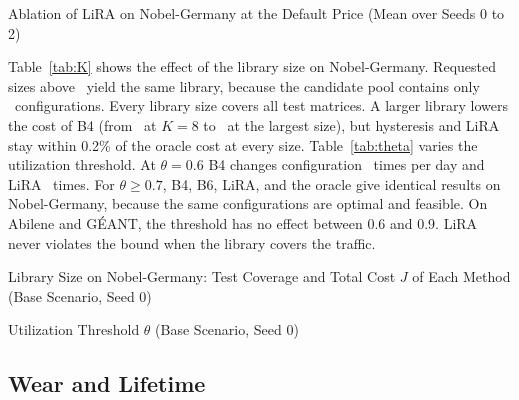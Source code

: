 \documentclass[preprint,12pt]{elsarticle}
\begin{document}
\begin{table}[t]
\centering
\caption{Ablation of LiRA on Nobel-Germany at the Default Price (Mean over Seeds 0 to 2)}
\label{tab:ablation}
\scriptsize
\setlength{\tabcolsep}{2pt}
\begin{adjustbox}{max width=\textwidth}\end{adjustbox}
\end{table}

Table~\ref{tab:K} shows the effect of the library size on Nobel-Germany. Requested sizes above \KactualMax\ yield the same library, because the candidate pool contains only \nobCand\ configurations. Every library size covers all test matrices. A larger library lowers the cost of B4 (from \KBFouratEight\ at $K=8$ to \KBFouratSixFour\ at the largest size), but hysteresis and LiRA stay within 0.2\% of the oracle cost at every size. Table~\ref{tab:theta} varies the utilization threshold. At $\theta=0.6$ B4 changes configuration \thSixBFourchg\ times per day and LiRA \thSixLiRAchg\ times. For $\theta\ge0.7$, B4, B6, LiRA, and the oracle give identical results on Nobel-Germany, because the same configurations are optimal and feasible. On Abilene and G\'{E}ANT, the threshold has no effect between 0.6 and 0.9. LiRA never violates the bound when the library covers the traffic.

\begin{table}[t]
\centering
\caption{Library Size on Nobel-Germany: Test Coverage and Total Cost $J$ of Each Method (Base Scenario, Seed 0)}
\label{tab:K}
\footnotesize
\setlength{\tabcolsep}{4pt}
\begin{adjustbox}{max width=\textwidth}\end{adjustbox}
\end{table}

\begin{table}[t]
\centering
\caption{Utilization Threshold $\theta$ (Base Scenario, Seed 0)}
\label{tab:theta}
\footnotesize
\setlength{\tabcolsep}{4pt}
\begin{adjustbox}{max width=\textwidth}\end{adjustbox}
\end{table}

\subsection{Wear and Lifetime}\label{sec:res-wear}
\end{document}

